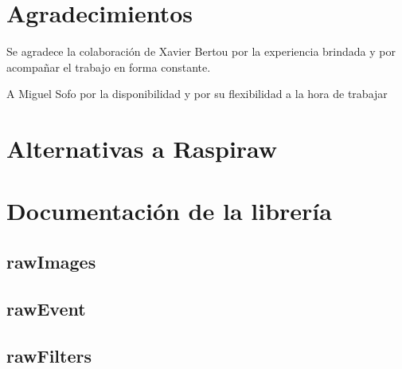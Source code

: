 \documentclass[twoside,twocolumn]{article}
\begin{document}
  
  

  \section*{Agradecimientos}
  Se agradece la colaboración de Xavier Bertou por la experiencia brindada y por
  acompañar el trabajo en forma constante.

  A Miguel Sofo por la disponibilidad y por su flexibilidad a la hora de trabajar

   
  \clearpage
  \appendix
    
  \section{Alternativas a Raspiraw}\label{sec:ap_alternatives}
  
  \section{Documentación de la librería}\label{sec:ap_doc}

  \subsection{rawImages}\label{sec:ap_doc:rawImages}

  \subsection{rawEvent}\label{sec:ap_doc:rawEvent}

  \subsection{rawFilters}\label{sec:ap_doc:rawFilters}

  
\end{document}
